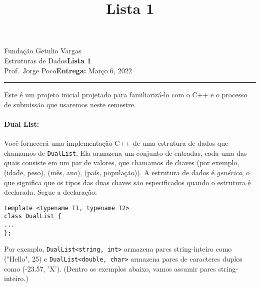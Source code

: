 \documentclass{article}
\title{Lista 1}
\date{}
\newcommand{\assignment}{Lista 1}
\newcommand{\duedate}{Março 6, 2022}
\begin{document}
Fundação Getulio Vargas\hfill\\
Estruturas de Dados\hfill\textbf{\assignment}\\
Prof.\ Jorge Poco\hfill\textbf{Entrega:} \duedate\\
\smallskip\hrule\bigskip

{\let\newpage\relax\maketitle}
\maketitle

Este é um projeto inicial projetado para familiarizá-lo com o C++ e o processo de submissão que usaremos neste semestre.


\paragraph{Dual List:}
Você fornecerá uma implementação C++ de uma estrutura de dados que chamamos de \texttt{DualList}. Ela armazena um conjunto de entradas, cada uma das quais consiste em um par de valores, que chamamos de chaves (por exemplo, (idade, peso), (mês, ano), (país, população)).
%
A estrutura de dados é \emph{genérica}, o que significa que os tipos das duas chaves são especificados quando o estrutura é declarada. Segue a declaração:

\begin{lstlisting}
template <typename T1, typename T2>
class DualList {
...
};
\end{lstlisting}

%
Por exemplo, \texttt{DualList<string, int>} armazena pares string-inteiro como ("Hello", 25) e \texttt{DualList<double, char>} armazena pares de caracteres duplos como (-23.57, 'X'). (Dentro os exemplos abaixo, vamos assumir pares string-inteiro.)
\end{document}
